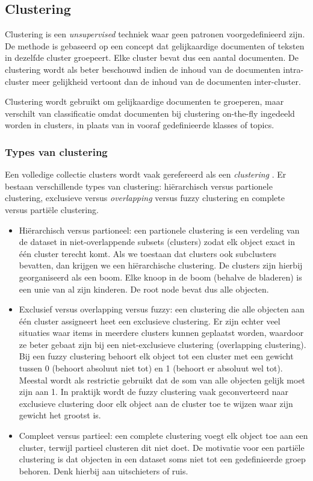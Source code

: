 \subsection{Clustering}\label{clustering}
Clustering is een \textit{unsupervised} techniek waar geen patronen voorgedefinieerd zijn. De methode is gebaseerd op een concept dat gelijkaardige documenten of teksten in dezelfde cluster groepeert. Elke cluster bevat dus een aantal documenten. De clustering wordt als beter beschouwd indien de inhoud van de documenten intra-cluster meer gelijkheid vertoont dan de inhoud van de documenten inter-cluster.

Clustering wordt gebruikt om gelijkaardige documenten te groeperen, maar verschilt van classificatie omdat documenten bij clustering on-the-fly ingedeeld worden in clusters, in plaats van in vooraf gedefinieerde klasses of topics.

\subsubsection{Types van clustering}
Een volledige collectie clusters wordt vaak gerefereerd als een \textit{clustering} \cite{Tan2005}. Er bestaan verschillende types van clustering: hi\"erarchisch versus partionele clustering, exclusieve versus \textit{overlapping} versus fuzzy clustering en complete versus parti\"ele clustering. 

\begin{itemize}
\item Hi\"erarchisch versus partioneel: een partionele clustering is een verdeling van de dataset in niet-overlappende subsets (clusters) zodat elk object exact in \'e\'en cluster terecht komt. Als we toestaan dat clusters ook subclusters bevatten, dan krijgen we een hi\"erarchische clustering. De clusters zijn hierbij georganiseerd als een boom. Elke knoop in de boom (behalve de bladeren) is een unie van al zijn kinderen. De root node bevat dus alle objecten. 
\item Exclusief versus overlapping versus fuzzy: een clustering die alle objecten aan \'e\'en cluster assigneert heet een exclusieve clustering. Er zijn echter veel situaties waar items in meerdere clusters kunnen geplaatst worden, waardoor ze beter gebaat zijn bij een niet-exclusieve clustering (overlapping clustering). Bij een fuzzy clustering behoort elk object tot een cluster met een gewicht tussen 0 (behoort absoluut niet tot) en 1 (behoort er absoluut wel tot). Meestal wordt als restrictie gebruikt dat de som van alle objecten gelijk moet zijn aan 1. In praktijk wordt de fuzzy clustering vaak geconverteerd naar exclusieve clustering door elk object aan de cluster toe te wijzen waar zijn gewicht het grootst is.
\item Compleet versus partieel: een complete clustering voegt elk object toe aan een cluster, terwijl partieel clusteren dit niet doet. De motivatie voor een parti\"ele clustering is dat objecten in een dataset soms niet tot een gedefinieerde groep behoren. Denk hierbij aan uitschieters of ruis. 
\end{itemize}

